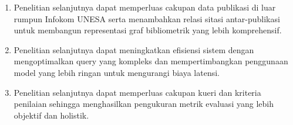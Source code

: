 \begin{enumerate}[label=\arabic*., leftmargin=0.75cm, itemsep=8pt]
      \item Penelitian selanjutnya dapat memperluas cakupan data publikasi di luar rumpun Infokom UNESA serta menambahkan relasi sitasi antar-publikasi untuk membangun representasi graf bibliometrik yang lebih komprehensif.

      \item Penelitian selanjutnya dapat meningkatkan efisiensi sistem dengan mengoptimalkan query yang kompleks dan mempertimbangkan penggunaan model yang lebih ringan untuk mengurangi biaya latensi.

      \item Penelitian selanjutnya dapat memperluas cakupan kueri dan kriteria penilaian sehingga menghasilkan pengukuran metrik evaluasi yang lebih objektif dan holistik.
\end{enumerate}